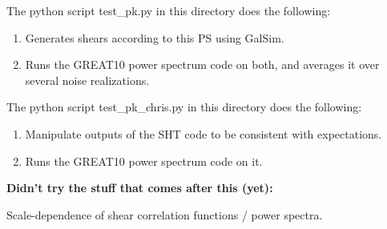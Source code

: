 \documentclass[preprint]{aastex}
\begin{document}
The python script test_pk.py in this directory does the following:
\begin{enumerate}
\item Generates shears according to this PS using GalSim.
\item Runs the GREAT10 power spectrum code on both, and averages it over several noise realizations.
\end{enumerate}

The python script test_pk_chris.py in this directory does the following:
\begin{enumerate}
\item Manipulate outputs of the SHT code to be consistent with expectations.
\item Runs the GREAT10 power spectrum code on it.
\end{enumerate}


\textbf{Didn't try the stuff that comes after this (yet):}

Scale-dependence of shear
correlation functions / power spectra.
\end{document}
